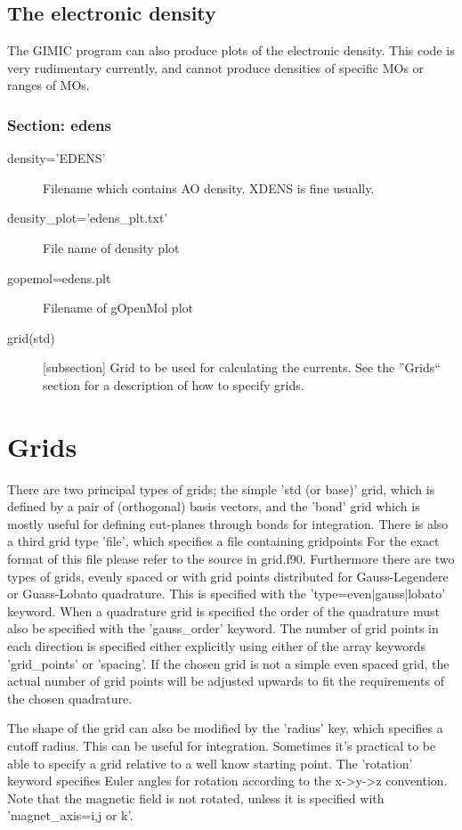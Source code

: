 \documentclass[a4paper,11pt]{article}
\begin{document}
\subsection{The electronic density}
The GIMIC program can also produce plots of the electronic density. This code
is very rudimentary currently, and cannot produce densities of specific MOs or
ranges of MOs.

\subsubsection*{Section: edens}
\begin{description}
  \item[density='EDENS'] Filename which contains AO density. XDENS is fine
	usually.
  \item[density\_plot='edens\_plt.txt'] File name of density plot
  \item[gopemol=edens.plt] Filename of gOpenMol plot
  \item[grid(std)] [subsection] Grid to be used for calculating the currents. 
	See the ''Grids`` section for a description of how to specify grids.
\end{description}

\section{Grids}
There are two principal types of grids; the simple 'std (or base)' grid, which
is defined by a pair of (orthogonal) basis vectors, and the 'bond' grid which
is mostly useful for defining cut-planes through bonds for integration. There
is also a third grid type 'file', which specifies a file containing gridpoints
For the exact format of this file please refer to the source in grid.f90.
Furthermore there are two types of grids, evenly spaced or with grid points
distributed for 
Gauss-Legendere or Guass-Lobato quadrature. This is specified with the
'type=even|gauss|lobato' keyword. When a quadrature grid is specified the
order of the quadrature must also be specified with the 'gauss\_order'
keyword.
The number of grid points in each direction is specified either explicitly
using either of the array keywords 'grid\_points' or 'spacing'. If the chosen
grid is not a simple even spaced grid, the actual number of grid points will
be adjusted upwards to fit the requirements of the chosen quadrature.

The shape of the grid can also be modified by the 'radius' key, which
specifies a cutoff radius. This can be useful for integration.
Sometimes it's practical to be able to specify a grid relative to a well know
starting point. The 'rotation' keyword specifies Euler angles for rotation
according to the x->y->z convention. Note that the magnetic field is not
rotated, unless it is specified with 'magnet\_axis=i,j or k'.
\end{document}
